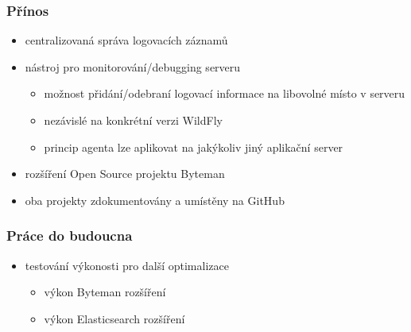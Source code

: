 \documentclass{beamer}
\begin{document}
\begin{frame}
	\frametitle{Přínos}
	\begin{itemize}
		\item centralizovaná správa logovacích záznamů
		\item nástroj pro monitorování/debugging serveru
		\begin{itemize}
			\item možnost přidání/odebraní logovací informace na libovolné místo v serveru
			\item nezávislé na konkrétní verzi WildFly
			\item princip agenta lze aplikovat na jakýkoliv jiný aplikační server
		\end{itemize}
		\item rozšíření Open Source projektu Byteman
		\item oba projekty zdokumentovány a umístěny na GitHub
	\end{itemize}
\end{frame}

\begin{frame}
	\frametitle{Práce do budoucna}
	\begin{itemize}
		\item testování výkonosti pro další optimalizace
		\begin{itemize}
			\item výkon Byteman rozšíření
			\item výkon Elasticsearch rozšíření
		\end{itemize}
	\end{itemize}
	
\end{frame}

\end{document}
